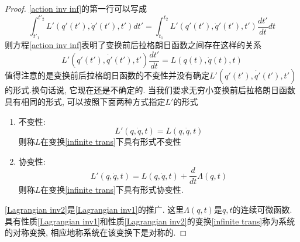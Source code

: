 \documentclass[a4paper,11pt]{article}
\newtheorem{proof}{证明}[section]
\begin{document}
\begin{proof}
  \eqref{action inv inf}的第一行可以写成
  \begin{equation*}
    \int_{t'_1}^{t'_2}L'(q'(t'),\dot{q}'(t'),t')dt'=\int_{t_1}^{t_2}L'(q'(t'),\dot{q}'(t'),t')\frac{dt'}{dt}dt
  \end{equation*}
  则方程\eqref{action inv inf}表明了变换前后拉格朗日函数之间存在这样的关系
  \begin{equation}\label{Lagrangian trans}
    L'(q'(t'),\dot{q'}(t'),t')\frac{dt'}{dt}=L(q(t),\dot{q}(t),t)
  \end{equation}
  值得注意的是变换前后拉格朗日函数的不变性并没有确定$L'(q'(t'),\dot{q'}(t'),t')$的形式.换句话说, 它现在还是不确定的. 当我们要求无穷小变换前后拉格朗日函数具有相同的形式, 可以按照下面两种方式指定$L'$的形式
  \begin{enumerate}[(1)]
    \item 不变性:\\
    \begin{equation}\label{Lagrangian inv1}
      L'(q,\dot{q},t)=L(q,\dot{q},t)
    \end{equation}
    则称$L$在变换\eqref{infinite trans}下具有形式不变性
    \item 协变性:\\
    \begin{equation}\label{Lagrangian inv2}
      L'(q,\dot{q},t)=L(q,\dot{q},t)+\frac{d}{dt}\Lambda(q,t)
    \end{equation}
    则称$L$在变换\eqref{infinite trans}下具有形式协变性.
  \end{enumerate}
  \eqref{Lagrangian inv2}是\eqref{Lagrangian inv1}的推广. 这里$\Lambda(q,t)$是$q,t$的连续可微函数. 具有性质\eqref{Lagrangian inv1}和性质\eqref{Lagrangian inv2}的变换\eqref{infinite trans}称为系统的对称变换, 相应地称系统在该变换下是对称的.


\end{proof}
\end{document}
